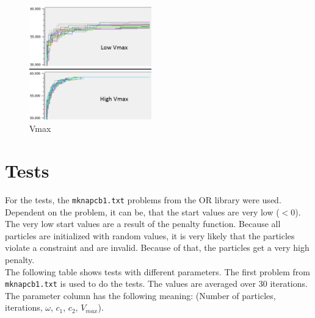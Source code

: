 \documentclass{article}
\begin{document}
\begin{figure}[H]
    \centering
    \includegraphics[width=200px]{images/vmax.PNG}
    \caption{Vmax}
    \label{fig-vmax}
\end{figure}

\section{Tests}
\label{lbl-tests}
For the tests, the \lstinline$mknapcb1.txt$ problems from the OR library were used.  Dependent on the problem, it can be, that the start values are very low ($< 0$). The very low start values are a result of the penalty function. Because all particles are initialized with random values, it is very likely that the particles violate a constraint and are invalid. Because of that, the particles get a very high penalty.\\

The following table shows tests with different parameters. The first problem from \lstinline$mknapcb1.txt$ is used to do the tests. The values are averaged over 30 iterations. The parameter column has the following meaning: (Number of particles, iterations, $\omega$, $c_1$, $c_2$, $V_{max}$). \\
\end{document}
